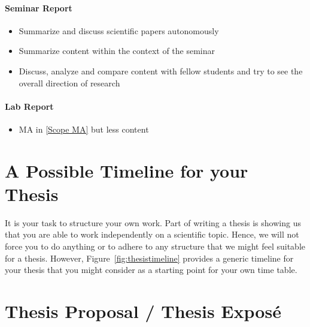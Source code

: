 \documentclass[twocolumn]{mlai-guide}
\begin{document}
\paragraph{Seminar Report}
	\begin{itemize}
		\item Summarize and discuss scientific papers autonomously
		\item Summarize content within the context of the seminar
		\item Discuss, analyze and compare content with fellow students and try to see the overall direction of research
	\end{itemize}
\paragraph{Lab Report}
	\begin{itemize}
		\item  MA in \ref{Scope MA} but less content
	\end{itemize}


\section{A Possible Timeline for your Thesis}

It is your task to structure your own work. 
Part of writing a thesis is showing us that you are able to work independently on a scientific topic. 
Hence, we will not force you to do anything or to adhere to any structure that we might feel suitable for a thesis. 
However, Figure~\ref{fig:thesistimeline} provides a generic timeline for your thesis that you might consider as a starting point for your own time table.






\begin{sidewaysfigure}

  \resizebox{\textheight}{!}{
    
  }

  \caption{A possible timeline of your thesis.}
  \label{fig:thesistimeline}
\end{sidewaysfigure}


\section{Thesis Proposal / Thesis Expos\'{e}}
\end{document}

